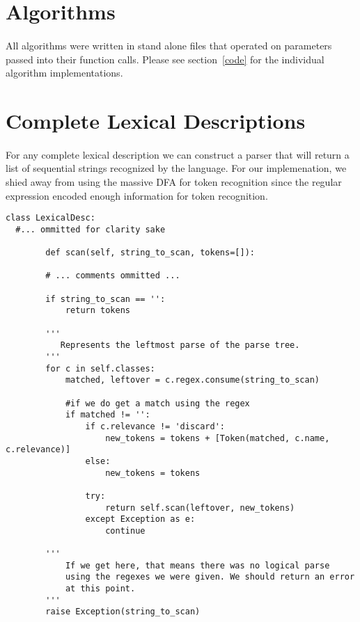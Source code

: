 \documentclass{article}
\begin{document}
\section{Algorithms}
\paragraph{}All algorithms were written in stand alone files that
operated on parameters passed into their function calls. Please see
section~\ref{code} for the individual algorithm implementations.

\section{Complete Lexical Descriptions}
\paragraph{}For any complete lexical description we can construct a 
parser that will return a list of sequential strings recognized by the
language. For our implemenation, we shied away from using the massive
DFA for token recognition since the regular expression encoded enough
information for token recognition. 

\begin{verbatim}
class LexicalDesc:
  #... ommitted for clarity sake

        def scan(self, string_to_scan, tokens=[]):

        # ... comments ommitted ...

        if string_to_scan == '':
            return tokens

        '''
           Represents the leftmost parse of the parse tree.
        '''
        for c in self.classes:
            matched, leftover = c.regex.consume(string_to_scan)

            #if we do get a match using the regex
            if matched != '':
                if c.relevance != 'discard':
                    new_tokens = tokens + [Token(matched, c.name, c.relevance)]
                else:
                    new_tokens = tokens

                try:
                    return self.scan(leftover, new_tokens)
                except Exception as e:
                    continue

        ''' 
            If we get here, that means there was no logical parse
            using the regexes we were given. We should return an error
            at this point. 
        '''
        raise Exception(string_to_scan)
\end{verbatim}
\end{document}
